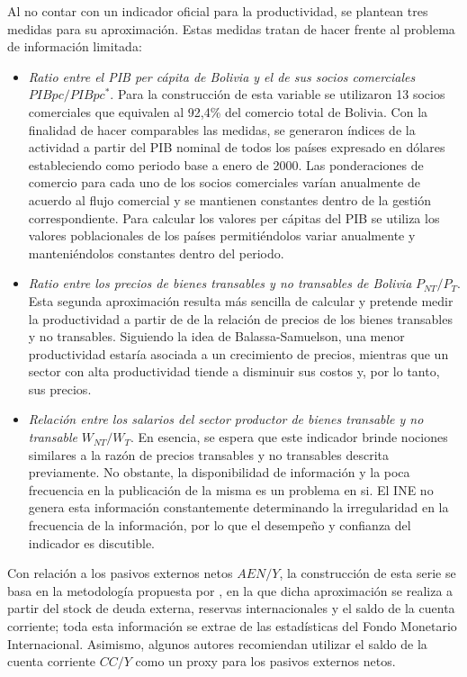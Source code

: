 \documentclass[12pt,letterpaper]{article}
\begin{document}
Al no contar con un indicador oficial para la productividad, se plantean tres medidas para su aproximación. Estas medidas tratan de hacer frente al problema de información limitada: 
\begin{itemize}
\item \emph{Ratio entre el PIB per cápita de Bolivia y el de sus socios comerciales} $PIBpc/PIBpc^*$. Para la construcción de esta variable se utilizaron 13 socios comerciales que equivalen al 92,4\% del comercio total de Bolivia. Con la finalidad de hacer comparables las medidas, se generaron índices de la actividad a partir del PIB nominal de todos los países expresado en dólares estableciendo como periodo base a enero de 2000. Las ponderaciones de comercio para cada uno de los socios comerciales varían anualmente de acuerdo al flujo comercial y se mantienen constantes dentro de la gestión correspondiente. Para calcular los valores per cápitas del PIB se utiliza los valores poblacionales de los países permitiéndolos variar anualmente y manteniéndolos constantes dentro del periodo. 
\item \emph{Ratio entre los precios de bienes transables y no transables de Bolivia} $P_{NT}/P_T$. Esta segunda aproximación resulta más sencilla de calcular y pretende medir la productividad a partir de de la relación de precios de los bienes transables y no transables. Siguiendo la idea de Balassa-Samuelson, una menor productividad estaría asociada a un crecimiento de precios, mientras que un sector con alta productividad tiende a disminuir sus costos y, por lo tanto, sus precios. 
\item \emph{Relación entre los salarios del sector productor de bienes transable y no transable} $W_{NT}/W_T$. En esencia, se espera que este indicador brinde nociones similares a la razón de precios transables y no transables descrita previamente. No obstante, la disponibilidad de información y la poca frecuencia en la publicación de la misma es un problema en si. El INE no genera esta información constantemente determinando la irregularidad en la frecuencia de la información, por lo que el desempeño y confianza del indicador es discutible. 
\end{itemize}

Con relación a los pasivos externos netos $AEN/Y$, la construcción de esta serie se basa en la metodología propuesta por \cite{lane2002ex}, en la que dicha aproximación se realiza a partir del stock de deuda externa, reservas internacionales y el saldo de la cuenta corriente; toda esta información se extrae de las estadísticas del Fondo Monetario Internacional. Asimismo, algunos autores recomiendan utilizar el saldo de la cuenta corriente $CC/Y$ como un proxy para los pasivos externos netos. 
\end{document}
